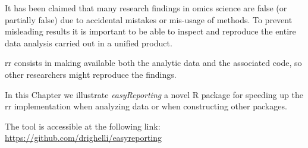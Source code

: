 


It has been claimed that many research findings in omics science are false (or partially false) due to accidental mistakes or mis-usage of methods.
To prevent misleading results it is important to be able to inspect and reproduce the entire data analysis carried out in a unified product.

\gls{rr} consists in making available both the analytic data and the associated code, so other researchers might reproduce the findings. 

In this Chapter we illustrate \textit{easyReporting} a novel R package for speeding up the \gls{rr} implementation when analyzing data or when constructing other packages.

The tool is accessible at the following link: \url{https://github.com/drighelli/easyreporting}